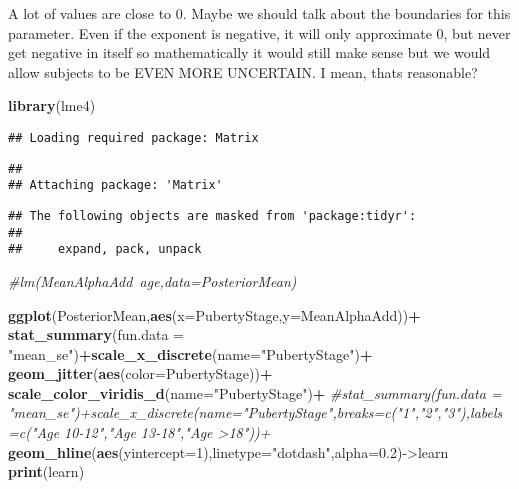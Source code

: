 \documentclass[]{article}
\newenvironment{Shaded}{\begin{snugshade}}{\end{snugshade}}
\newcommand{\KeywordTok}[1]{\textcolor[rgb]{0.13,0.29,0.53}{\textbf{#1}}}
\newcommand{\DataTypeTok}[1]{\textcolor[rgb]{0.13,0.29,0.53}{#1}}
\newcommand{\DecValTok}[1]{\textcolor[rgb]{0.00,0.00,0.81}{#1}}
\newcommand{\FloatTok}[1]{\textcolor[rgb]{0.00,0.00,0.81}{#1}}
\newcommand{\StringTok}[1]{\textcolor[rgb]{0.31,0.60,0.02}{#1}}
\newcommand{\CommentTok}[1]{\textcolor[rgb]{0.56,0.35,0.01}{\textit{#1}}}
\newcommand{\OperatorTok}[1]{\textcolor[rgb]{0.81,0.36,0.00}{\textbf{#1}}}
\newcommand{\NormalTok}[1]{#1}
\begin{document}
A lot of values are close to 0. Maybe we should talk about the
boundaries for this parameter. Even if the exponent is negative, it will
only approximate 0, but never get negative in itself so mathematically
it would still make sense but we would allow subjects to be EVEN MORE
UNCERTAIN. I mean, thats reasonable?

\begin{Shaded}
\begin{Highlighting}[]
\KeywordTok{library}\NormalTok{(lme4)}
\end{Highlighting}
\end{Shaded}

\begin{verbatim}
## Loading required package: Matrix
\end{verbatim}

\begin{verbatim}
## 
## Attaching package: 'Matrix'
\end{verbatim}

\begin{verbatim}
## The following objects are masked from 'package:tidyr':
## 
##     expand, pack, unpack
\end{verbatim}

\begin{Shaded}
\begin{Highlighting}[]
\CommentTok{#lm(MeanAlphaAdd~age,data=PosteriorMean)}

\KeywordTok{ggplot}\NormalTok{(PosteriorMean,}\KeywordTok{aes}\NormalTok{(}\DataTypeTok{x=}\NormalTok{PubertyStage,}\DataTypeTok{y=}\NormalTok{MeanAlphaAdd))}\OperatorTok{+}
\StringTok{  }\KeywordTok{stat_summary}\NormalTok{(}\DataTypeTok{fun.data =} \StringTok{"mean_se"}\NormalTok{)}\OperatorTok{+}\KeywordTok{scale_x_discrete}\NormalTok{(}\DataTypeTok{name=}\StringTok{"PubertyStage"}\NormalTok{)}\OperatorTok{+}\StringTok{  }\KeywordTok{geom_jitter}\NormalTok{(}\KeywordTok{aes}\NormalTok{(}\DataTypeTok{color=}\NormalTok{PubertyStage))}\OperatorTok{+}
\StringTok{  }\KeywordTok{scale_color_viridis_d}\NormalTok{(}\DataTypeTok{name=}\StringTok{"PubertyStage"}\NormalTok{)}\OperatorTok{+}
\StringTok{  }\CommentTok{#stat_summary(fun.data = "mean_se")+scale_x_discrete(name="PubertyStage",breaks=c("1","2","3"),labels=c("Age 10-12","Age 13-18","Age >18"))+}
\StringTok{  }\KeywordTok{geom_hline}\NormalTok{(}\KeywordTok{aes}\NormalTok{(}\DataTypeTok{yintercept=}\DecValTok{1}\NormalTok{),}\DataTypeTok{linetype=}\StringTok{"dotdash"}\NormalTok{,}\DataTypeTok{alpha=}\FloatTok{0.2}\NormalTok{)->learn}
\KeywordTok{print}\NormalTok{(learn)}
\end{Highlighting}
\end{Shaded}
\end{document}

